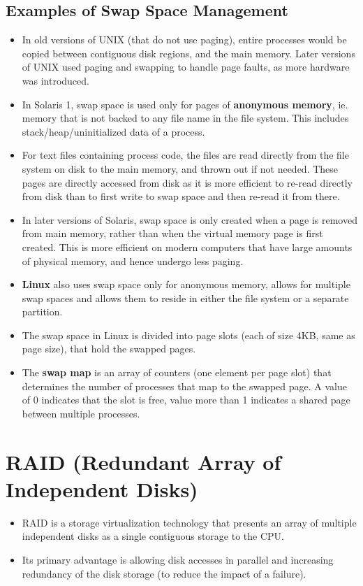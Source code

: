 \documentclass{article}
\theoremstyle{plain}
\theoremstyle{definition}
\begin{document}
\subsection{Examples of Swap Space Management}
\begin{itemize}
    \item In old versions of UNIX (that do not use paging), entire processes would be copied between contiguous disk regions, and the main memory. Later versions of UNIX used paging and swapping to handle page faults, as more hardware was introduced.
    
    \item In Solaris 1, swap space is used only for pages of \textbf{anonymous memory}, ie. memory that is not backed to any file name in the file system. This includes stack/heap/uninitialized data of a process. 
    
    \item For text files containing process code, the files are read directly from the file system on disk to the main memory, and thrown out if not needed. These pages are directly accessed from disk as it is more efficient to re-read directly from disk than to first write to swap space and then re-read it from there. 
    
    \item In later versions of Solaris, swap space is only created when a page is removed from main memory, rather than when the virtual memory page is first created. This is more efficient on modern computers that have large amounts of physical memory, and hence undergo less paging.
    
    \item \textbf{Linux} also uses swap space only for anonymous memory, allows for multiple swap spaces and allows them to reside in either the file system or a separate partition. 
    
    \item The swap space in Linux is divided into page slots (each of size 4KB, same as page size), that hold the swapped pages.
    
    \item The \textbf{swap map} is an array of counters (one element per page slot) that determines the number of processes that map to the swapped page. A value of 0 indicates that the slot is free, value more than 1 indicates a shared page between multiple processes. 
\end{itemize}

\section{RAID (Redundant Array of Independent Disks)}
\begin{itemize}
    \item RAID is a storage virtualization technology that presents an array of multiple independent disks as a single contiguous storage to the CPU.
    
    \item Its primary advantage is allowing disk accesses in parallel and increasing redundancy of the disk storage (to reduce the impact of a failure). 
\end{itemize}
\end{document}
